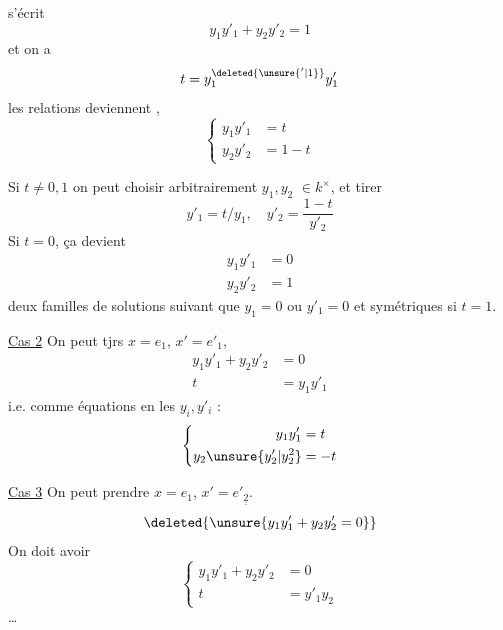 s'écrit
\[
y_1y'_1+y_2y'_2=1
\]
et on a
\[
t=y_1^{\deleted{\unsure{'|1}}}y'_1
\]
 les relations deviennent ,
\[
\left\{\begin{aligned}y_1y'_1&=t\\ y_2y'_2&=1-t\end{aligned}\right.
\]

Si $t\ne0,1$ on peut choisir arbitrairement $y_1,y_2$  $\in k^{\times}$, et tirer 
\[
y'_1=t/y_1,\quad y'_2=\frac{1-t}{y'_2}
\]
Si $t=0$,  ça devient
\[
\begin{aligned} y_1y'_1&=0\\ y_2y'_2&=1\end{aligned}
\]
deux familles de solutions  suivant que $y_1=0$ ou $y'_1=0$ et symétriques si $t=1$.

\uline{Cas 2} On peut tjrs $x=e_1$, $x'=e'_1$, 
\[
\begin{aligned} y_1y'_1+y_2y'_2&=0\\ t&=y_1y'_1\end{aligned}
\]
i.e. comme équations en les $y_i,y'_i$ : 
\[
\left\{\begin{aligned} y_1y'_1&=t\\ y_2\unsure{y'_2|y_2^2}&=-t\end{aligned}\right.
\]

\uline{Cas 3} On peut prendre $x=e_1$, $x'=e'_{\underline{\underline 2}}$.
\[
\deleted{\unsure{y_1y'_1+y_2y'_2=0}}
\]
On doit avoir
\[
\left\{\begin{aligned} y_1y'_1+y_2y'_2&=0\\ t&=y'_1y_2\end{aligned}\right.
\]
 \ldots
